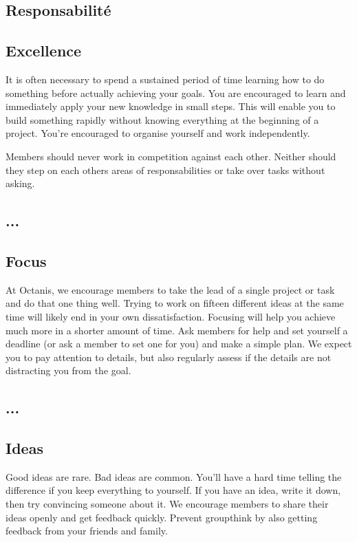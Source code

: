 \french
	\subsection{Responsabilité}


\english
	\subsection{Excellence}
 	It is often necessary to spend a sustained period of time learning how to do something before actually achieving your goals. You are encouraged to learn and immediately apply your new knowledge in small steps. This will enable you to build something rapidly without knowing everything at the beginning of a project. You're encouraged to organise yourself and work independently. 
 	

	Members should never work in competition against each other. Neither should they step on each others areas of responsabilities or take over tasks without asking.




\french
	\subsection{...}

	
\english
	\subsection{Focus}
	At Octanis, we encourage members to take the lead of a single project or task and do that one thing well. Trying to work on fifteen different ideas at the same time will likely end in your own dissatisfaction. Focusing will help you achieve much more in a shorter amount of time. Ask members for help and set yourself a deadline (or ask a member to set one for you) and make a simple plan.
	We expect you to pay attention to details, but also regularly assess if the details are not distracting you from the goal.




\french
	\subsection{...}

	

\english
	\subsection{Ideas}
	Good ideas are rare. Bad ideas are common. You'll have a hard time telling the difference if you keep everything to yourself.
	If you have an idea, write it down, then try convincing someone about it. We encourage members to share their ideas openly and get feedback quickly. Prevent groupthink by also getting feedback from your friends and family.

